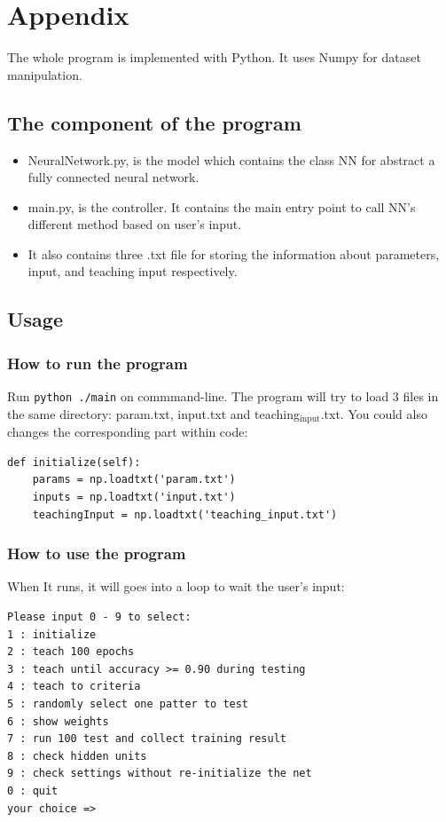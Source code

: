 \documentclass[11pt]{article}
\begin{document}
\section{Appendix}
\label{sec-5}
The whole program is implemented with Python. It uses Numpy for dataset manipulation.
\subsection{The component of the program}
\label{sec-5-1}
\begin{itemize}
\item NeuralNetwork.py, is the model which contains the class NN for abstract a fully connected neural network.
\item main.py, is the controller. It contains the main entry point to call NN's different method based on user's input.
\item It also contains three .txt file for storing the information about parameters, input, and teaching input respectively.
\end{itemize}
\subsection{Usage}
\label{sec-5-2}
\subsubsection{How to run the program}
\label{sec-5-2-1}
Run \texttt{python ./main} on commmand-line.
The program will try to load 3 files in the same directory: param.txt, input.txt and teaching$_{\text{input}}$.txt. You could also changes the corresponding part within code:
\begin{verbatim}
def initialize(self):
    params = np.loadtxt('param.txt')
    inputs = np.loadtxt('input.txt')
    teachingInput = np.loadtxt('teaching_input.txt')
\end{verbatim}
\subsubsection{How to use the program}
\label{sec-5-2-2}
When It runs, it will goes into a loop to wait the user's input:
\begin{verbatim}
Please input 0 - 9 to select:
1 : initialize
2 : teach 100 epochs
3 : teach until accuracy >= 0.90 during testing
4 : teach to criteria
5 : randomly select one patter to test
6 : show weights
7 : run 100 test and collect training result
8 : check hidden units
9 : check settings without re-initialize the net
0 : quit
your choice =>
\end{verbatim}
\end{document}
